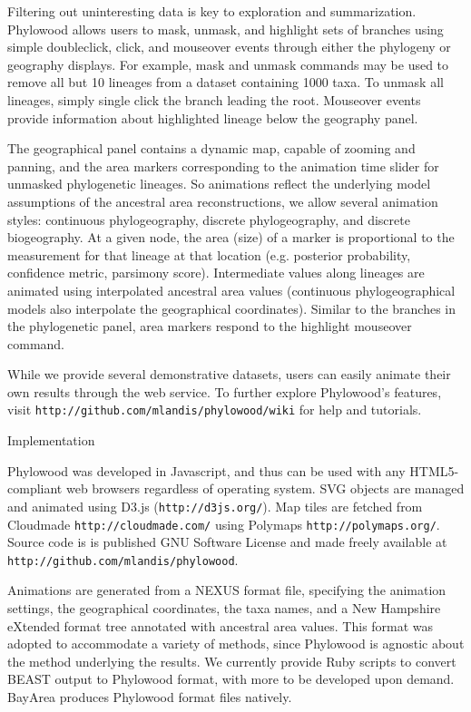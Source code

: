 \documentclass[11pt]{article}
\begin{document}
Filtering out uninteresting data is key to exploration and summarization. Phylowood allows users to mask, unmask, and highlight sets of branches using simple doubleclick, click, and mouseover events through either the phylogeny or geography displays. For example, mask and unmask commands may be used to remove all but 10 lineages from a dataset containing 1000 taxa. To unmask all lineages, simply single click the branch leading the root. Mouseover events provide information about highlighted lineage below the geography panel.

The geographical panel contains a dynamic map, capable of zooming and panning, and the area markers corresponding to the animation time slider for unmasked phylogenetic lineages. So animations reflect the underlying model assumptions of the ancestral area reconstructions, we allow several animation styles: continuous phylogeography, discrete phylogeography, and discrete biogeography. At a given node, the area (size) of a marker is proportional to the measurement for that lineage at that location (e.g. posterior probability, confidence metric, parsimony score). Intermediate values along lineages are animated using interpolated ancestral area values (continuous phylogeographical models also interpolate the geographical coordinates). Similar to the branches in the phylogenetic panel, area markers respond to the highlight mouseover command.

While we provide several demonstrative datasets, users can easily animate their own results through the web service. To further explore Phylowood's features, visit \texttt{http://github.com/mlandis/phylowood/wiki} for help and tutorials.

\bigskip

\begin{center}
{\sc Implementation}
\end{center}

Phylowood was developed in Javascript, and thus can be used with any HTML5-compliant web browsers regardless of operating system. SVG objects are managed and animated using D3.js (\texttt{http://d3js.org/}). Map tiles are fetched from Cloudmade \texttt{http://cloudmade.com/} using Polymaps \texttt{http://polymaps.org/}. Source code is is published GNU Software License and made freely available at \texttt{http://github.com/mlandis/phylowood}.

Animations are generated from a NEXUS format file, specifying the animation settings, the geographical coordinates, the taxa names, and a New Hampshire eXtended format tree annotated with ancestral area values. This format was adopted to accommodate a variety of methods, since Phylowood is agnostic about the method underlying the results. We currently provide Ruby scripts to convert BEAST output to Phylowood format, with more to be developed upon demand. BayArea produces Phylowood format files natively.
\end{document}
